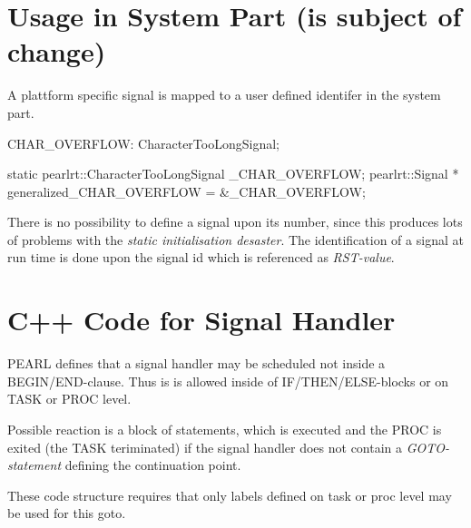 \section{Usage in System Part (is subject of change)}
A plattform specific signal is mapped to a user defined identifer in the 
system part. 

\begin{PEARLCode}
CHAR_OVERFLOW: CharacterTooLongSignal;
\end{PEARLCode}

\begin{CppCode}
static pearlrt::CharacterTooLongSignal _CHAR_OVERFLOW;
pearlrt::Signal * generalized_CHAR_OVERFLOW = &_CHAR_OVERFLOW;
\end{CppCode}

There is no possibility to define a signal upon its number, since this
produces lots of problems with the {\em static initialisation desaster}.
The identification of a signal at run time is done upon the signal id
which is referenced as {\em RST-value}.


\section{C++ Code for Signal Handler}
PEARL defines that a signal handler may be scheduled not inside 
a BEGIN/END-clause. Thus is is allowed inside of IF/THEN/ELSE-blocks
or on TASK or PROC level.

Possible reaction is a block of statements, which is executed and the
PROC is exited (the TASK teriminated) if the signal handler does not
contain a {\em GOTO-statement} defining the continuation point.

These code structure requires that only labels defined on task or proc level
may be used for this goto.


